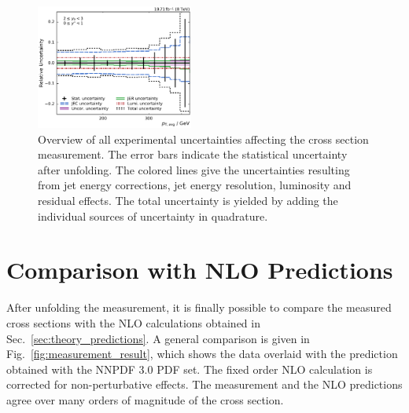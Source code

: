 \begin{figure}[htbp]
    \includegraphics[width=0.46\textwidth]{figures/measurement/exp_unc_overview_yb2ys0.pdf}
    \caption[Overview of experimental uncertainties]{Overview of all
    experimental uncertainties affecting the cross section measurement. The
    error bars indicate the statistical uncertainty after unfolding. The colored
    lines give the uncertainties resulting from jet energy corrections, jet energy
    resolution, luminosity and residual effects. The total uncertainty is yielded by
    adding the individual sources of uncertainty in quadrature.}
    \label{fig:exp_unc_overview}
\end{figure}

\section{Comparison with NLO Predictions}
\label{sec:nlo_comparisons}

After unfolding the measurement, it is finally possible to
compare the measured cross sections with the NLO calculations obtained in
Sec.~\ref{sec:theory_predictions}. A general comparison is given in
Fig.~\ref{fig:measurement_result}, which shows the data overlaid with the
\NLOJETPP prediction obtained with the NNPDF 3.0 PDF set. The fixed order NLO
calculation is corrected for non-perturbative effects. The measurement
and the NLO predictions agree over many orders of magnitude of the cross section.

